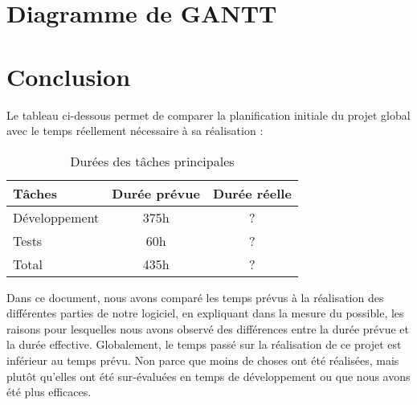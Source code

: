 \documentclass[a4paper]{report}
\begin{document}
\chapter{Diagramme de GANTT}


\chapter{Conclusion}

Le tableau ci-dessous permet de comparer la planification initiale du projet global avec le temps réellement nécessaire à sa réalisation :

\begin{table}[H]
\centering
  \begin{tabularx}{0.8\textwidth}{| X | c | c |}
    \hline
	Tâches & Durée prévue & Durée réelle \\
    \hline
    Développement & 375h & ?\\
    Tests & 60h & ?\\
    \hline
	Total & 435h & ?\\
    \hline
  \end{tabularx}
  \caption{Durées des tâches principales}
\end{table}

Dans ce document, nous avons comparé les temps prévus à la réalisation des différentes parties de notre logiciel, en expliquant dans la mesure du possible, les raisons pour lesquelles nous avons observé des différences entre la durée prévue et la durée effective.
Globalement, le temps passé sur la réalisation de ce projet est inférieur au temps prévu.
Non parce que moins de choses ont été réalisées, mais plutôt qu'elles ont été sur-évaluées en temps de développement ou que nous avons été plus efficaces.
\end{document}
